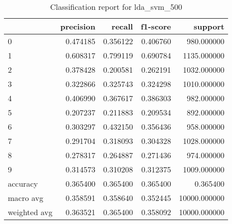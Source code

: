 \begin{table}[htb!]
\centering
\caption{Classification report for lda_svm_500}
\label{tab:classification-report-lda_svm_500}
\begin{tabular}{lrrrr}
\toprule
 & precision & recall & f1-score & support \\
\midrule
0 & 0.474185 & 0.356122 & 0.406760 & 980.000000 \\
1 & 0.608317 & 0.799119 & 0.690784 & 1135.000000 \\
2 & 0.378428 & 0.200581 & 0.262191 & 1032.000000 \\
3 & 0.322866 & 0.325743 & 0.324298 & 1010.000000 \\
4 & 0.406990 & 0.367617 & 0.386303 & 982.000000 \\
5 & 0.207237 & 0.211883 & 0.209534 & 892.000000 \\
6 & 0.303297 & 0.432150 & 0.356436 & 958.000000 \\
7 & 0.291704 & 0.318093 & 0.304328 & 1028.000000 \\
8 & 0.278317 & 0.264887 & 0.271436 & 974.000000 \\
9 & 0.314573 & 0.310208 & 0.312375 & 1009.000000 \\
accuracy & 0.365400 & 0.365400 & 0.365400 & 0.365400 \\
macro avg & 0.358591 & 0.358640 & 0.352445 & 10000.000000 \\
weighted avg & 0.363521 & 0.365400 & 0.358092 & 10000.000000 \\
\bottomrule
\end{tabular}
\end{table}
